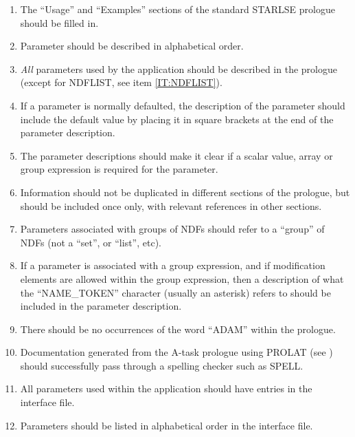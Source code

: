 \documentclass[twoside,11pt,nolof]{starlink}
\begin{document}
\begin{enumerate}
\item The ``Usage'' and ``Examples'' sections of the standard {\small STARLSE}
prologue should be filled in.

\item Parameter should be described in alphabetical order.

\item \emph{All} parameters used by the application should be described in the
prologue (except for {\small NDFLIST}, see item \ref{IT:NDFLIST}).

\item If a parameter is normally defaulted, the description of the parameter
should include the default value by placing it in square brackets at the end of
the parameter description.

\item The parameter descriptions should make it clear if a scalar value, array
or group expression is required for the parameter.

\item Information should not be duplicated in different sections of the
prologue, but should be included once only, with relevant references in other
sections.

\item Parameters associated with groups of {\small NDF}s should refer to a
``group'' of {\small NDF}s (not a ``set'', or ``list'', etc).

\item If a parameter is associated with a group expression, and if modification
elements are allowed within the group expression, then a description of what the
``{\small NAME\_TOKEN}'' character (usually an asterisk) refers to should be
included in the parameter description.

\item There should be no occurrences of the word ``{\small ADAM}'' within the
prologue.

\item Documentation generated from the A-task prologue using {\small PROLAT}
(see ) should successfully pass through a spelling
checker such as {\small SPELL}.

\item All parameters used within the application should have entries in the
interface file.

\item Parameters should be listed in alphabetical order in the interface file.


\end{enumerate}
\end{document}
